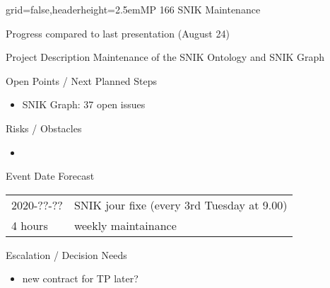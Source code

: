 \documentclass[english]{kiesgrube}
\begin{document}
\begin{poster}{grid=false,headerheight=2.5em}{}{MP 166 SNIK Maintenance}{}{}
\begin{posterbox}[name=progress,below=person]{Progress compared to last presentation (August 24)}
\end{posterbox}
\begin{posterbox}[name=description,column=1,row=0]{Project Description}
Maintenance of the SNIK Ontology and SNIK Graph
\end{posterbox}
\begin{posterbox}[name=open,column=1,below=description]{Open Points / Next Planned Steps}
\begin{itemize}
\item SNIK Graph: 37 open issues
\end{itemize}
\end{posterbox}
\begin{posterbox}[name=risks,column=1,below=open]{Risks / Obstacles}
\begin{itemize}
\item
\end{itemize}
\end{posterbox}
\begin{posterbox}[name=event,column=1,below=open]{Event Date Forecast}
\begin{tabulary}{\textwidth}{lL}
2020-??-??	&SNIK jour fixe	(every 3rd Tuesday at 9.00)\\
4 hours		&weekly maintainance\\
\end{tabulary}
\end{posterbox}
\begin{posterbox}[name=escalation,column=1,below=event]{Escalation / Decision Needs}
\begin{itemize}
\item new contract for TP later?
\end{itemize}
\end{posterbox}
\footer
\end{poster}

\newpage
\end{document}
